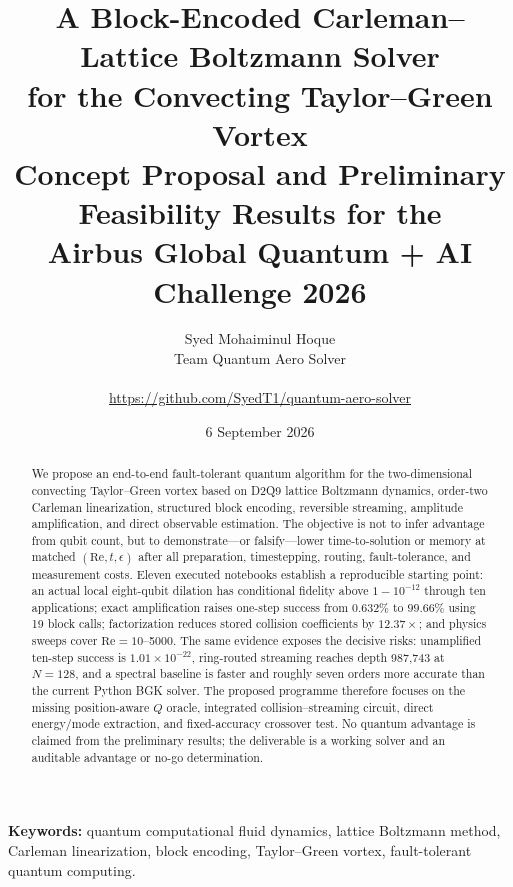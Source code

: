 \documentclass[10pt,twocolumn]{article}
\title{\vspace{-1.25em}\textbf{A Block-Encoded Carleman--Lattice Boltzmann Solver\\
for the Convecting Taylor--Green Vortex}\\[-0.05em]
\large Concept Proposal and Preliminary Feasibility Results for the\\Airbus Global Quantum + AI Challenge 2026}
\author{Syed Mohaiminul Hoque\\\normalsize Team Quantum Aero Solver\\
\normalsize \email{syedmuhaimintahsin@gmail.com}\\
\small\url{https://github.com/SyedT1/quantum-aero-solver}}
\date{6 September 2026}
\newcommand{\Rey}{\mathrm{Re}}
\begin{document}
\maketitle

\begin{abstract}
We propose an end-to-end fault-tolerant quantum algorithm for the two-dimensional
convecting Taylor--Green vortex based on D2Q9 lattice Boltzmann dynamics,
order-two Carleman linearization, structured block encoding, reversible
streaming, amplitude amplification, and direct observable estimation. The
objective is not to infer advantage from qubit count, but to demonstrate---or
falsify---lower time-to-solution or memory at matched $(\Rey,t,\epsilon)$ after
all preparation, timestepping, routing, fault-tolerance, and measurement costs.
Eleven executed notebooks establish a reproducible starting point: an actual
local eight-qubit dilation has conditional fidelity above $1-10^{-12}$ through
ten applications; exact amplification raises one-step success from $0.632\%$
to $99.66\%$ using 19 block calls; factorization reduces stored collision
coefficients by $12.37\times$; and physics sweeps cover $\Rey=10$--5000. The
same evidence exposes the decisive risks: unamplified ten-step success is
$1.01\times10^{-22}$, ring-routed streaming reaches depth 987,743 at $N=128$,
and a spectral baseline is faster and roughly seven orders more accurate than
the current Python BGK solver. The proposed programme therefore focuses on the
missing position-aware $Q$ oracle, integrated collision--streaming circuit,
direct energy/mode extraction, and fixed-accuracy crossover test. No quantum
advantage is claimed from the preliminary results; the deliverable is a
working solver and an auditable advantage or no-go determination.
\end{abstract}
\noindent\textbf{Keywords:} quantum computational fluid dynamics, lattice
Boltzmann method, Carleman linearization, block encoding, Taylor--Green vortex,
fault-tolerant quantum computing.
\end{document}
